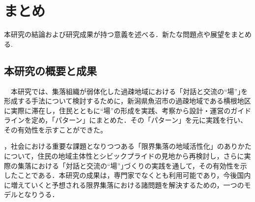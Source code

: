 \documentclass[a4paper]{jsarticle}
\begin{document}
\section{まとめ}
本研究の結論および研究成果が持つ意義を述べる．新たな問題点や展望をまとめる.

\subsection{本研究の概要と成果}
　本研究では、集落組織が弱体化した過疎地域における「対話と交流の“場”｣を形成する手法について検討するために，新潟県魚沼市の過疎地域である横根地区に実際に滞在し，住民とともに“場”の形成を実践、考察から設計・運営のガイドラインを定め，「パターン」にまとめた．その「パターン」を元に実践を行い、その有効性を示すことができた。



，社会における重要な課題となりつつある「限界集落の地域活性化」のありかたについて，住民の地域主体性とシビックプライドの見地から再検討し，さらに実際の集落における「対話と交流の“場”｣づくりの実践を通して，その有効性を示したことである．本研究の成果は，専門家でなくとも利用可能であり，今後国内に増えていくと予想される限界集落における諸問題を解決するための，一つのモデルとなりうる．
\newpage
\end{document}
